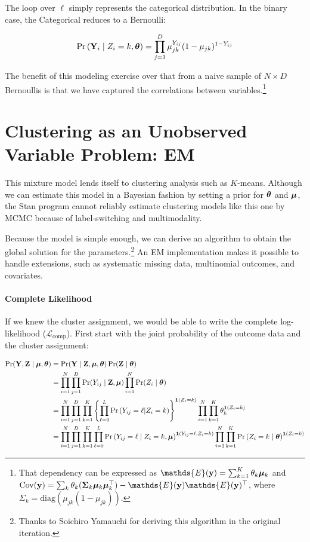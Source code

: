 \documentclass[11pt]{article}
\begin{document}
The loop over \(\ell\) simply represents the categorical distribution. In the binary case, the Categorical reduces to a Bernoulli:

\begin{align}
\mathbb{\Pr}\left(\mathbf{Y}_{i} \mid Z_{i} = k, \bm{\theta}\right) = \prod^{D}_{j=1}\mu_{jk}^{Y_{ij}}(1 - \mu_{jk})^{1- Y_{ij}}\nonumber
\end{align}




The benefit of this modeling exercise over that from a naive sample of
\(N \times D\) Bernoullis is that we have captured the correlations
between variables.\footnote{That dependency can be expressed as \(\mathds{E}(\by) = \sum_{k = 1}^{K} \theta_{k} \bmu_{k}\) and 
\(\cov({\by}) = \sum_{k} \theta_{k} (\mathbf{\Sigma}_k \bmu_k\bmu_{k}^{\top}) - \mathds{E}(\by)\mathds{E}(\by)^\top\), where \(\Sigma_k = \text{diag}(\mu_{jk}(1 - \mu_{jk}))\).}


\section{Clustering as an Unobserved Variable Problem: EM}

This mixture model lends itself to clustering analysis such as \(K\)-means. Although we can estimate this model in a Bayesian fashion by setting a prior for \(\bm{\theta}\) and \(\bm{\mu}\), the \textsf{Stan} program cannot reliably estimate clustering models like this one by MCMC because of label-switching and multimodality. 

Because the model is simple enough, we can derive an algorithm to obtain the global solution for the parameters.\footnote{Thanks to Soichiro Yamauchi for deriving this algorithm in the original iteration.} An EM implementation makes it possible to handle extensions, such as systematic missing data, multinomial outcomes, and covariates. 

\paragraph{Complete Likelihood} If we knew the cluster assignment, we would be able to write the complete log-likelihood (\(\mathcal{L}_{\text{comp}}\)). First start with the joint probability of the outcome data and the cluster assignment:

\begin{align}
\Pr(\mathbf{Y}, \mathbf{Z} \mid \bm{\mu}, \bm{\theta}) &= \Pr(\mathbf{Y} \mid \mathbf{Z}, \bm{\mu}, \bm{\theta})\Pr(\mathbf{Z} \mid \bm{\theta})\nonumber\\
&= \prod^{N}_{i=1}\prod^{D}_{j=1}\Pr(Y_{ij} \mid \mathbf{Z}, \bm{\mu}) \prod^N_{i=1}\Pr(Z_i \mid \bm{\theta})\nonumber\\
&= \prod^{N}_{i=1}\prod^{D}_{j=1}\prod^{K}_{k=1}\left\{\prod^{L}_{\ell=0}\mathbb{\Pr}\left(Y_{ij} = \ell | Z_i = k\right)\right\}^{\bm{1}\left(Z_i=k\right)} \prod^N_{i=1}\prod^K_{k=1}\theta_{k}^{\bm{1}\left(Z_i = k\right)}\nonumber \\
&= \prod^{N}_{i=1}\prod^{D}_{j=1}\prod^{K}_{k=1}\prod^{L}_{\ell=0}\mathbb{\Pr}\left(Y_{ij} = \ell \mid Z_{i} = k, \bm{\mu}\right)^{\bm{1}\left(Y_{ij} = \ell, Z_i = k\right)} \prod^N_{i=1}\prod^K_{k=1}\mathbb{\Pr}\left(Z_i = {k} \mid \bm{\theta}\right)^{\bm{1}\left(Z_i = k\right)}\nonumber
\end{align}
\end{document}
